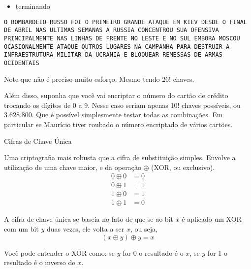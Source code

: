 \begin{frame}{}{}
\small
\begin{itemize}
\item  terminando
\end{itemize}
\texttt{O BOMBARDEIO RUSSO FOI O PRIMEIRO GRANDE ATAQUE EM KIEV DESDE O FINAL DE ABRIL NAS ULTIMAS SEMANAS A RUSSIA CONCENTROU SUA OFENSIVA PRINCIPALMENTE NAS LINHAS DE FRENTE NO LESTE E NO SUL EMBORA MOSCOU OCASIONALMENTE ATAQUE OUTROS LUGARES NA CAMPANHA PARA DESTRUIR A INFRAESTRUTURA MILITAR DA UCRANIA E BLOQUEAR REMESSAS DE ARMAS OCIDENTAIS}
\begin{itemize}
\pitem Note que não é preciso muito esforço.
\pitem Mesmo tendo 26! chaves.
\end{itemize}
\end{frame}


\begin{frame}{}{}
\begin{itemize}
\pitem Além disso, suponha que você vai encriptar o número do cartão de crédito trocando os dígitos de 0 a 9. 
\pitem Nesse caso seriam apenas 10! chaves possíveis, ou 3.628.800.
\pitem Que é possível simplesmente testar todas as combinações. Em particular se Maurício tiver roubado o número encriptado de vários cartões.
\end{itemize}
\end{frame}



\begin{frame}{Cifras de Chave Única}{}
\begin{itemize}
\pitem Uma criptografia mais robusta que a cifra de substituição simples. Envolve a utilização de uma chave maior, e da operação $\oplus$ (XOR, ou exclusivo).
\begin{align}
0 \oplus 0 &= 0 \\
0 \oplus 1 &= 1 \\
1 \oplus 0 &= 1 \\
1 \oplus 1 &= 0 
\end{align}
\end{itemize}
\end{frame}

\begin{frame}{}{}
\begin{itemize}
\pitem A cifra de chave única se baseia no fato de que se ao bit $x$ é aplicado um XOR com um bit $y$ duas vezes, ele volta a ser $x$, ou seja,
$$
(x \oplus y) \oplus y = x
$$

\pitem Você pode entender o XOR como: se $y$ for 0 o resultado é o $x$, se $y$ for 1 o resultado é o inverso de $x$.
\end{itemize}
\end{frame}


